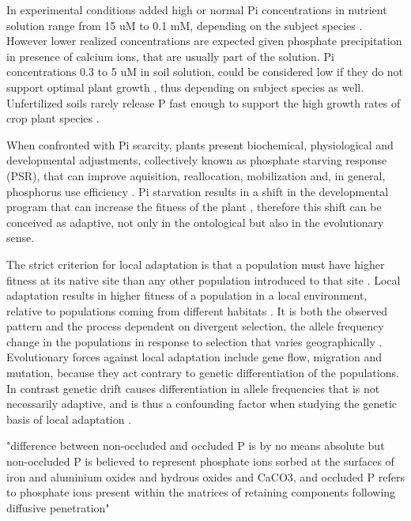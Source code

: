 \documentclass[10pt,letterpaper]{article}
\begin{document}
In experimental conditions added high or normal Pi concentrations in nutrient solution range from 15 uM to 0.1 mM, depending on the subject species \cite{Scheible:2015hxa}. However lower realized concentrations are expected given phosphate precipitation in presence of calcium ions, that are usually part of the solution. Pi concentrations 0.3 to 5 uM in soil solution, could be considered low if they do not support optimal plant growth \cite{Scheible:2015hxa,Schachtman:1998vv}, thus depending on subject species as well. Unfertilized soils rarely release P fast enough to support the high growth rates of crop plant species \cite{Schachtman:1998vv}.

When confronted with Pi scarcity, plants present biochemical, physiological and developmental adjustments, collectively known as phosphate starving response (PSR), that can improve aquisition, reallocation, mobilization and, in general, phosphorus use efficiency \cite{Scheible:2015hxa}. Pi starvation results in a shift in the developmental program that can increase the fitness of the plant \cite{Peret:2011jd}, therefore this shift can be conceived as adaptive, not only in the ontological but also in the evolutionary sense.

The strict criterion for local adaptation is that a population must have higher fitness at its native site than any other population introduced to that site \cite{Savolainen:2013df}. Local adaptation results in higher fitness  of a population in a local environment, relative to populations coming from different habitats \cite{Kawecki:2004hx}. It is both the observed pattern and the process dependent on divergent selection, the allele frequency change in the populations in response to selection that varies geographically \cite{Tiffin:2014ft}. Evolutionary forces against local adaptation include gene flow, migration and  mutation, because  they act contrary to genetic differentiation of the populations. In contrast genetic drift causes differentiation in allele frequencies that is not necessarily adaptive, and is thus a confounding factor when studying the genetic basis of local adaptation \cite{Kawecki:2004hx}.



"difference between non-occluded and occluded P is by no means absolute but non-occluded P is believed to represent phosphate ions sorbed at the surfaces of iron and aluminium oxides and hydrous oxides and CaCO3, and occluded P refers to phosphate ions present within the matrices of retaining components following diffusive penetration" \cite{WALKER19761}
\end{document}
